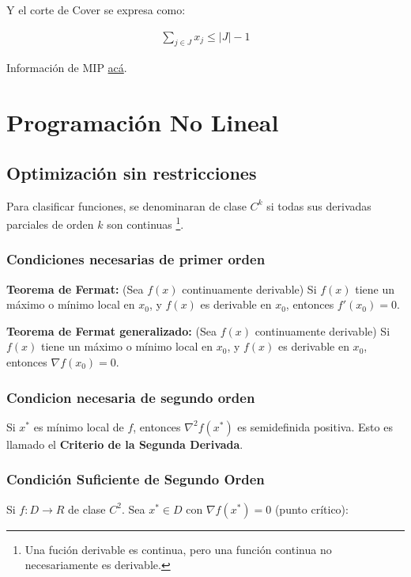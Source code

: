 \documentclass{article}
\begin{document}
Y el corte de Cover se expresa como:

\begin{align*}
    \sum_{j \in J} x_j \leq |J| - 1
\end{align*}

Información de MIP \href{https://optimization.cbe.cornell.edu/index.php?title=Mixed-integer_cuts}{acá}.

\section{Programaci\'on No Lineal}

\subsection{Optimizaci\'on sin restricciones}

Para clasificar funciones, se denominaran de clase $C^k$ si todas sus derivadas parciales de orden $k$ son continuas \footnote{Una fución derivable es continua, pero una función continua no necesariamente es derivable.}.

\subsubsection{Condiciones necesarias de primer orden}

\textbf{Teorema de Fermat:} (Sea $f(x)$ continuamente derivable) Si $f(x)$ tiene un máximo o mínimo local en $x_0$, y $f(x)$ es derivable en $x_0$, entonces $f'(x_0) = 0$.

\textbf{Teorema de Fermat generalizado:} (Sea $f(x)$ continuamente derivable) Si $f(x)$ tiene un máximo o mínimo local en $x_0$, y $f(x)$ es derivable en $x_0$, entonces $\nabla f(x_0) = 0$.

\subsubsection{Condicion necesaria de segundo orden}

Si $x^*$ es mínimo local de $f$, entonces $\nabla^2f(x^*)$ es semidefinida positiva. Esto es llamado el \textbf{Criterio de la Segunda Derivada}.

\subsubsection{Condición Suficiente de Segundo Orden}

Si $f:D\to R$ de clase $C^2$. Sea $x^* \in D$ con $\nabla f(x^*)=0$ (punto crítico):
\end{document}
